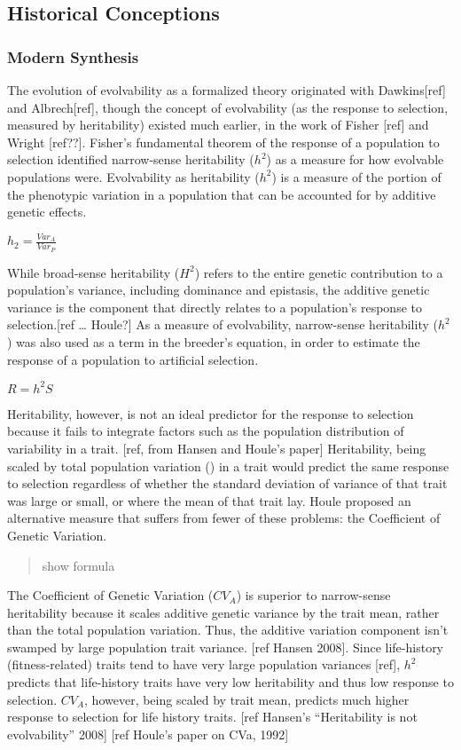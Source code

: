 \subsection{Historical Conceptions}
\subsubsection{Modern Synthesis}

The evolution of evolvability as a formalized theory originated with Dawkins[ref] and Albrech[ref], though the concept of evolvability (as the response to selection, measured by heritability) existed much earlier, in the work of Fisher [ref] and Wright [ref??].  Fisher’s fundamental theorem of the response of a population to selection identified narrow-sense heritability ($h^2$) as a measure for how evolvable populations were. Evolvability as heritability ($h^2$) is a measure of the portion of the phenotypic variation in a population that can be accounted for by additive genetic effects.

$h_2 = \frac{Var_A}{Var_P}$

While broad-sense heritability ($H^2$) refers to the entire genetic contribution to a population’s variance, including dominance and epistasis, the additive genetic variance is the component that directly relates to a population’s response to selection.[ref … Houle?] As a measure of evolvability, narrow-sense heritability ($h^2$) was also used as a term in the breeder’s equation, in order to estimate the response of a population to artificial selection.

$R = {h^2}S$

Heritability, however, is not an ideal predictor for the response to selection because it fails to integrate factors such as the population distribution of variability in a trait. [ref, from Hansen and Houle’s paper] Heritability, being scaled by total population variation () in a trait would predict the same response to selection regardless of whether the standard deviation of variance of that trait was large or small, or where the mean of that trait lay.
Houle proposed an alternative measure that suffers from fewer of these problems: the Coefficient of Genetic Variation.

\begin{quote}
show formula
\end{quote}

The Coefficient of Genetic Variation ($CV_A$) is superior to narrow-sense heritability because it scales additive genetic variance by the trait mean, rather than the total population variation. Thus, the additive variation component isn’t swamped by large population trait variance. [ref Hansen 2008]. Since life-history (fitness-related) traits tend to have very large population variances [ref], $h^2$predicts that life-history traits have very low heritability and thus low response to selection. $CV_A$, however, being scaled by trait mean, predicts much higher response to selection for life history traits. [ref  Hansen’s “Heritability is not evolvability” 2008] [ref Houle’s paper on CVa, 1992]

